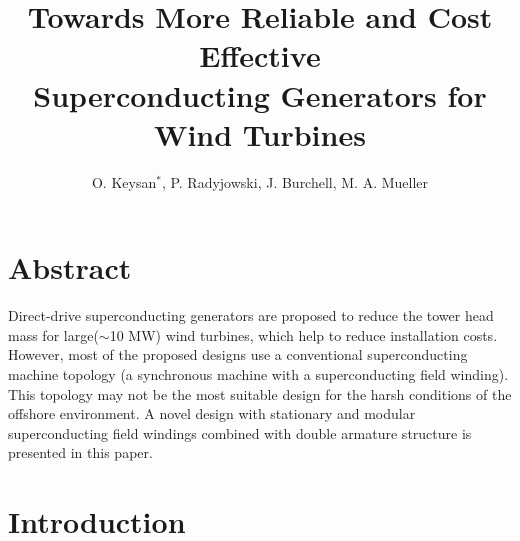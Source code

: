 \documentclass[12pt]{IET02}
\begin{document}
\title{Towards More Reliable and Cost Effective \\Superconducting Generators for Wind Turbines}


\author{O. Keysan$^{*}$, P. Radyjowski, J. Burchell, M. A. Mueller}

\address{\textit{Institute for Energy Systems, University of Edinburgh, United Kingdom}\\
$^{*}$\textit{Email: o.keysan@ed.ac.uk}}



\twocolumn

\maketitle

\section*{Abstract}

Direct-drive superconducting generators are proposed to reduce the tower head mass for large($\sim$10 MW) wind turbines, which help to reduce installation costs. However, most of the proposed designs use a conventional superconducting machine topology (a synchronous machine with a superconducting field winding). This topology may not be the most suitable design for the harsh conditions of the offshore environment. A novel design with stationary and modular superconducting field windings combined with double armature structure is presented in this paper.
\vspace{1pc}

\section{Introduction}
\end{document}

